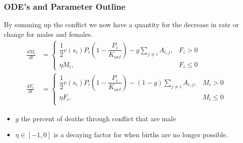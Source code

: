 \documentclass[t]{beamer}
\begin{document}
\begin{frame}
\frametitle{ODE's and Parameter Outline}

By summing up the conflict we now have a quantity for the decrease in rate or change for males and females.
\begin{align*}
    \frac{dM_i}{dt}
    &= \begin{cases}
        \dfrac{1}{2}r(s_i)P_i\left(1 - \dfrac{P_i}{K_{net}}\right) - g\displaystyle\sum\limits_{j \neq i} A_{i,j}, & F_i > 0 \\
        \eta M_i, & F_i \leq 0 %
    \end{cases}\\
    \frac{dF_i}{dt}
    & = \begin{cases}
        \dfrac{1}{2}r(s_i)P_i\left(1 - \dfrac{P_i}{K_{net}}\right) - \left(1-g\right)\displaystyle\sum\limits_{j \neq i} A_{i,j}, & M_i > 0 \\
        \eta F_i, & M_i \leq 0 \\
    \end{cases}
\end{align*}


\begin{itemize}
\item $g$ the percent of deaths through conflict that are male
\\
\item $\eta \in [-1,0]$ is a decaying factor for when births are no longer possible.
\end{itemize}

\end{frame}
\end{document}
